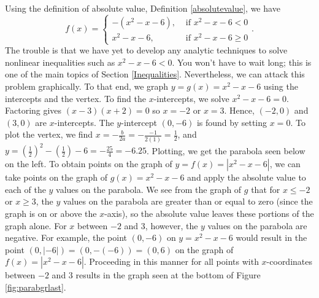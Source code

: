 {
Using the definition of absolute value, Definition \ref{absolutevalue}, we have
\[
 f(x) = \begin{cases}
 		 -\left(x^2 - x - 6\right), & \mbox{ if } x^2 - x - 6 < 0  \\
 		  x^2 - x - 6, & \mbox{ if } x^2 - x - 6 \geq 0
 		\end{cases}.
\]
The trouble is that we have yet to develop any analytic techniques to solve nonlinear inequalities such as $x^2 - x - 6 < 0$.  You won't have to wait long; this is one of the main topics of Section \ref{Inequalities}.  Nevertheless, we can attack this problem graphically.  To that end, we graph $y = g(x) = x^2 - x-6$ using the intercepts and the vertex.  To find the $x$-intercepts, we solve $x^2 - x - 6 = 0$.  Factoring gives $(x-3)(x+2)=0$ so $x=-2$ or $x=3$.  Hence, $(-2,0)$ and $(3,0)$ are $x$-intercepts. The $y$-intercept $(0,-6)$ is found by setting $x=0$.  To plot the vertex, we find $x = -\frac{b}{2a} = -\frac{-1}{2(1)} = \frac{1}{2}$, and $y =  \left(\frac{1}{2}\right)^2 - \left(\frac{1}{2}\right)-6 = -\frac{25}{4} = -6.25$.  Plotting, we get the parabola seen below on the left.  To obtain points on the graph of $y = f(x) = |x^2-x-6|$, we can take points on the graph of $g(x) =  x^2-x-6$ and apply the absolute value to each of the $y$ values on the parabola.  We see from the graph of $g$ that for $x \leq -2$ or $x \geq 3$, the $y$ values on the parabola are greater than or equal to zero (since the graph is on or above the $x$-axis), so the absolute value leaves these portions of the graph alone.  For $x$ between $-2$ and $3$, however, the $y$ values on the parabola are negative.  For example, the point $(0,-6)$ on $y = x^2-x-6$ would result in the point $(0,|-6|) = (0,-(-6))= (0,6)$ on the graph of $f(x) = |x^2-x-6|$.  Proceeding in this manner for all points with $x$-coordinates between $-2$ and $3$ results in the graph seen at the bottom of Figure \ref{fig:parabgrlast}.

}

